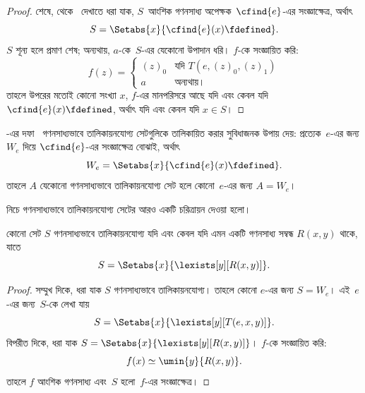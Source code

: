 \documentclass[../../../include/open-logic-section]{subfiles}
\begin{document}
\begin{proof}
শেষে,  থেকে~ দেখাতে ধরা যাক,
$S$~আংশিক গণনসাধ্য অপেক্ষক~$\cfind{e}$-এর সংজ্ঞাক্ষেত্র, অর্থাৎ
\[
S = \Setabs{x}{\cfind{e}(x) \fdefined}.
\]
$S$ শূন্য হলে প্রমাণ শেষ; অন্যথায়, $a$-কে~$S$-এর যেকোনো উপাদান ধরি।
$f$-কে সংজ্ঞায়িত করি:
\[
f(z) = \begin{cases}
(z)_0 & \text{যদি $T(e,(z)_0,(z)_1)$} \\
a & \text{অন্যথায়।}
\end{cases}
\]
তাহলে উপরের মতোই কোনো সংখ্যা $x$, $f$-এর মানপরিসরে আছে যদি এবং কেবল
যদি $\cfind{e}(x) \fdefined$, অর্থাৎ যদি এবং কেবল যদি $x \in S$।
\end{proof}

-এর দফা~ গণনসাধ্যভাবে
তালিকায়নযোগ্য সেটগুলিকে তালিকায়িত করার সুবিধাজনক উপায় দেয়: প্রত্যেক~$e$-এর
জন্য $W_e$ দিয়ে $\cfind{e}$-এর সংজ্ঞাক্ষেত্র বোঝাই, অর্থাৎ
\[
W_e = \Setabs{x}{\cfind{e}(x) \fdefined}.
\]
তাহলে $A$ যেকোনো গণনসাধ্যভাবে তালিকায়নযোগ্য সেট হলে কোনো~$e$-এর জন্য
$A = W_e$।

নিচে গণনসাধ্যভাবে তালিকায়নযোগ্য সেটের আরও একটি চরিত্রায়ন দেওয়া হলো।

\begin{thm}
কোনো সেট $S$ গণনসাধ্যভাবে তালিকায়নযোগ্য যদি এবং কেবল যদি এমন একটি
গণনসাধ্য সম্বন্ধ $R(x,y)$ থাকে, যাতে
\[
S = \Setabs{ x }{ \lexists[y][R(x,y)] }.
\]
\end{thm}

\begin{proof}
সম্মুখ দিকে, ধরা যাক $S$ গণনসাধ্যভাবে তালিকায়নযোগ্য। তাহলে কোনো $e$-এর
জন্য $S = W_e$। এই~$e$-এর জন্য~$S$-কে লেখা যায়
\[
S = \Setabs{ x }{ \lexists[y][T(e, x, y)] }.
\]
বিপরীত দিকে, ধরা যাক $S = \Setabs{ x }{
  \lexists[y][R(x, y)] }$। $f$-কে সংজ্ঞায়িত করি:
\[
f(x) \simeq \umin{y}{R(x, y)}.
\]
তাহলে $f$ আংশিক গণনসাধ্য এবং~$S$ হলো~$f$-এর সংজ্ঞাক্ষেত্র।
\end{proof}
\end{document}

